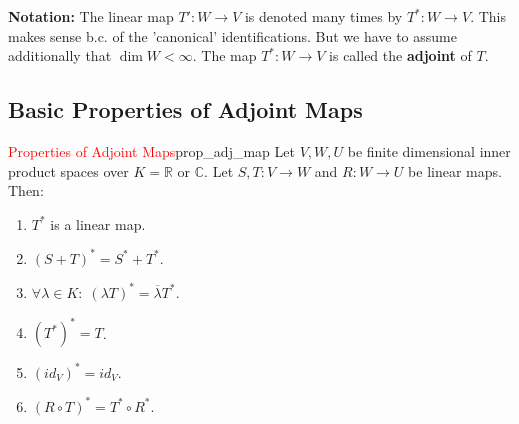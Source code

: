 \textbf{Notation:} The linear map $T' :W \to V$ is denoted many times by $T^*:W \to V$. This makes sense b.c. of the 'canonical' identifications. But we have to assume additionally that $ \dim W < \infty$. The map $T^*:W \to V$ is called the \textbf{adjoint} of $T$.

\subsection{Basic Properties of Adjoint Maps}
\begin{lemma}{\textcolor{red}{Properties of Adjoint Maps}}{prop_adj_map}
	Let $V, W, U$ be finite dimensional inner product spaces over $K = \mathbb{R}$ or $\mathbb{C}$. Let $S, T:V \to W$ and $R:W \to U$ be linear maps. Then:
	\begin{enumerate}
		\item $T^*$ is a linear map.
		\item $(S + T)^* = S^* + T^*$.
		\item $\forall \lambda \in K : \; (\lambda T)^* = \overline{\lambda}T^*$.
		\item $(T^*)^* = T$.
		\item $(id_V)^* = id_V$.
		\item $(R \circ T)^* = T^* \circ R^*$.
	\end{enumerate}
\end{lemma}

